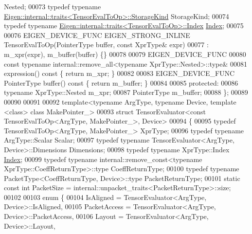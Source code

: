 \begin{DoxyCode}
       Nested;
00073   \textcolor{keyword}{typedef} \textcolor{keyword}{typename} \hyperlink{struct_eigen_1_1internal_1_1traits}{Eigen::internal::traits<TensorEvalToOp>::StorageKind}
       StorageKind;
00074   \textcolor{keyword}{typedef} \textcolor{keyword}{typename} \hyperlink{struct_eigen_1_1internal_1_1traits}{Eigen::internal::traits<TensorEvalToOp>::Index}
       \hyperlink{namespace_eigen_a62e77e0933482dafde8fe197d9a2cfde}{Index};
00075 
00076   EIGEN\_DEVICE\_FUNC EIGEN\_STRONG\_INLINE TensorEvalToOp(PointerType buffer, \textcolor{keyword}{const} XprType& expr)
00077       : m\_xpr(expr), m\_buffer(buffer) \{\}
00078 
00079     EIGEN\_DEVICE\_FUNC
00080     \textcolor{keyword}{const} \textcolor{keyword}{typename} internal::remove\_all<typename XprType::Nested>::type&
00081     expression()\textcolor{keyword}{ const }\{ \textcolor{keywordflow}{return} m\_xpr; \}
00082 
00083     EIGEN\_DEVICE\_FUNC PointerType buffer()\textcolor{keyword}{ const }\{ \textcolor{keywordflow}{return} m\_buffer; \}
00084 
00085   \textcolor{keyword}{protected}:
00086     \textcolor{keyword}{typename} XprType::Nested m\_xpr;
00087     PointerType m\_buffer;
00088 \};
00089 
00090 
00091 
00092 \textcolor{keyword}{template}<\textcolor{keyword}{typename} ArgType, \textcolor{keyword}{typename} Device, \textcolor{keyword}{template} <\textcolor{keyword}{class}> \textcolor{keyword}{class }MakePointer\_>
00093 \textcolor{keyword}{struct }TensorEvaluator<const TensorEvalToOp<ArgType, MakePointer\_>, Device>
00094 \{
00095   \textcolor{keyword}{typedef} TensorEvalToOp<ArgType, MakePointer\_> XprType;
00096   \textcolor{keyword}{typedef} \textcolor{keyword}{typename} ArgType::Scalar Scalar;
00097   \textcolor{keyword}{typedef} \textcolor{keyword}{typename} TensorEvaluator<ArgType, Device>::Dimensions Dimensions;
00098   \textcolor{keyword}{typedef} \textcolor{keyword}{typename} XprType::Index \hyperlink{namespace_eigen_a62e77e0933482dafde8fe197d9a2cfde}{Index};
00099   \textcolor{keyword}{typedef} \textcolor{keyword}{typename} internal::remove\_const<typename XprType::CoeffReturnType>::type CoeffReturnType;
00100   \textcolor{keyword}{typedef} \textcolor{keyword}{typename} PacketType<CoeffReturnType, Device>::type PacketReturnType;
00101   \textcolor{keyword}{static} \textcolor{keyword}{const} \textcolor{keywordtype}{int} PacketSize = internal::unpacket\_traits<PacketReturnType>::size;
00102 
00103   \textcolor{keyword}{enum} \{
00104     IsAligned = TensorEvaluator<ArgType, Device>::IsAligned,
00105     PacketAccess = TensorEvaluator<ArgType, Device>::PacketAccess,
00106     Layout = TensorEvaluator<ArgType, Device>::Layout,

\end{DoxyCode}
